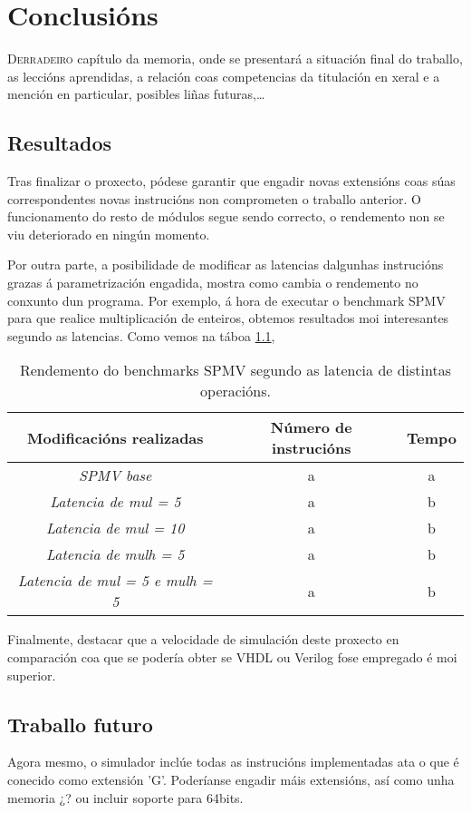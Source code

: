 \chapter{Conclusións}
\label{chap:conclusions}

\lettrine{D}{erradeiro} capítulo da memoria, onde se presentará a
situación final do traballo, as leccións aprendidas, a relación coas competencias da titulación en xeral e a mención en particular,
posibles liñas futuras,\dots

\section{Resultados}\label{chap:resultados}
Tras finalizar o proxecto, pódese garantir que engadir novas extensións coas súas correspondentes novas instrucións non comprometen o traballo anterior. O funcionamento do resto de módulos segue sendo correcto, o rendemento non se viu deteriorado en ningún momento.

Por outra parte, a posibilidade de modificar as latencias dalgunhas instrucións grazas á parametrización engadida, mostra como cambia o rendemento no conxunto dun programa. Por exemplo, á hora de executar o benchmark SPMV para que realice multiplicación de enteiros, obtemos resultados moi interesantes segundo as latencias. Como vemos na táboa \ref{tab:rendemento_spmv}, 

\begin{table}[hp!]
    \centering
    \begin{tabular}{c|c|c}
    \rowcolor{udcpink!25}
    \textbf{Modificacións realizadas} & \textbf{Número de instrucións}  & \textbf{Tempo} 
    \\\hline
    \textit{SPMV base} & a & a \\
    \textit{Latencia de mul = 5} & a & b\\
    \textit{Latencia de mul = 10} & a & b\\
    \textit{Latencia de mulh = 5} & a & b\\
    \textit{Latencia de mul = 5 e mulh = 5} & a & b\\
    \end{tabular}
    \caption{Rendemento do benchmarks SPMV segundo as latencia de distintas operacións.}
    \label{tab:rendemento_spmv}
\end{table}

Finalmente, destacar que a velocidade de simulación deste proxecto en comparación coa que se podería obter se VHDL ou Verilog fose empregado é moi superior.

\section{Traballo futuro}\label{chap:traballo_futuro}
Agora mesmo, o simulador inclúe todas as instrucións implementadas ata o que é conecido como extensión 'G'. Poderíanse engadir máis extensións, así como unha memoria ¿? ou incluir soporte para 64bits.


